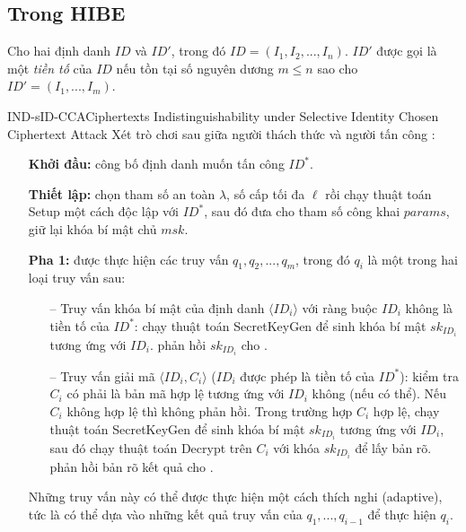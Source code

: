 \documentclass[class=report, crop=false]{standalone}
\begin{document}
		\subsection{Trong HIBE}
			\begin{definition}
				Cho hai định danh $ID$ và $ID'$, trong đó $ID = (I_1, I_2, ..., I_n)$. $ID'$ được gọi là một \textit{tiền tố} của $ID$ nếu tồn tại số nguyên dương $m \leq n$ sao cho $ID' = (I_1, ..., I_m)$.
			\end{definition}
			\begin{game}{IND-sID-CCA}{Ciphertexts Indistinguishability under Selective Identity Chosen Ciphertext Attack}
				Xét trò chơi sau giữa người thách thức \challenger và người tấn công \adversary:
				\vspace{-1.8\baselineskip}
				\begin{itemize}[leftmargin=1.5cm, itemindent=-0.5cm]
					\item[] \textbf{Khởi đầu:} \adversary công bố định danh muốn tấn công $ID^*$.
					\item[] \textbf{Thiết lập:} \challenger chọn tham số an toàn $\lambda$, số cấp tối đa $\ell$ rồi chạy thuật toán \textsf{Setup} một cách độc lập với $ID^*$, sau đó đưa cho \adversary tham số công khai $params$, giữ lại khóa bí mật chủ $msk$.
					\item[] \textbf{Pha 1:} \adversary được thực hiện các truy vấn $q_1, q_2, ..., q_m$, trong đó $q_i$ là một trong hai loại truy vấn sau:
					\begin{itemize}
						\item[--] Truy vấn khóa bí mật của định danh $\langle ID_i \rangle$ với ràng buộc $ID_i$ không là tiền tố của $ID^*$: \challenger chạy thuật toán \textsf{SecretKeyGen} để sinh khóa bí mật $sk_{ID_i}$ tương ứng với $ID_i$. \challenger phản hồi $sk_{ID_i}$ cho \adversary .
						\item[--] Truy vấn giải mã $\langle ID_i, C_i \rangle$ ($ID_i$ được phép là tiền tố của $ID^*$): \challenger kiểm tra $C_i$ có phải là bản mã hợp lệ tương ứng với $ID_i$ không (nếu có thể). Nếu $C_i$ không hợp lệ thì \challenger không phản hồi. Trong trường hợp $C_i$ hợp lệ, \challenger chạy thuật toán \textsf{SecretKeyGen} để sinh khóa bí mật $sk_{ID_i}$ tương ứng với $ID_i$, sau đó chạy thuật toán \textsf{Decrypt} trên $C_i$ với khóa $sk_{ID_i}$ để lấy bản rõ. \challenger phản hồi bản rõ kết quả cho \adversary .
					\end{itemize}
					Những truy vấn này có thể được thực hiện một cách thích nghi (adaptive), tức là \adversary có thể dựa vào những kết quả truy vấn của $q_1, ..., q_{i - 1}$ để thực hiện $q_i$.

\end{itemize}
\end{game}
\end{document}
